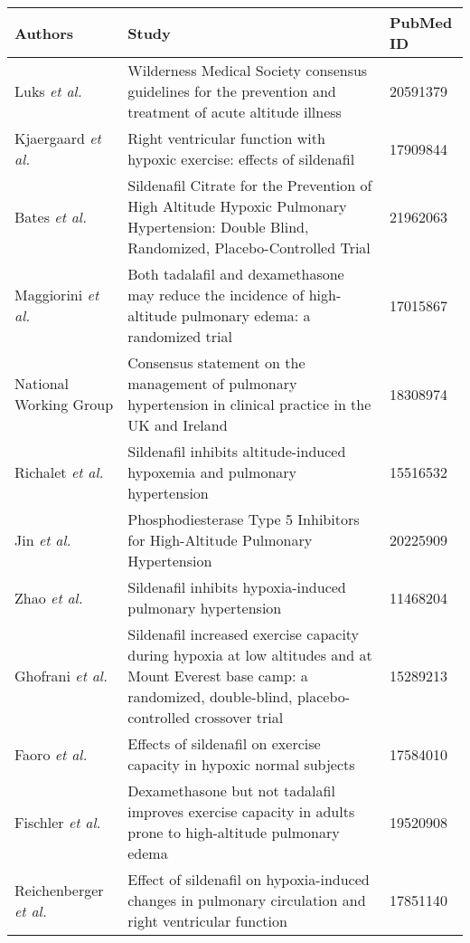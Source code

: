 \documentclass[12pt,a4paper]{article}
\begin{document}
\begin{longtabu} to\linewidth{X[l] X[2,l] X[l]}
    \toprule
    \rowfont\bfseries Authors & Study & PubMed ID \\
    \midrule
    \endhead
    Luks \emph{et al.}\cite{Luks:2010ht} & Wilderness Medical Society consensus guidelines for the prevention and treatment of acute altitude illness & 20591379 \\
    Kjaergaard \emph{et al.}\cite{Kjaergaard:2007hp} & Right ventricular function with hypoxic exercise: effects of sildenafil & 17909844 \\
    Bates \emph{et al.}\cite{Bates:2011du} & Sildenafil Citrate for the Prevention of High Altitude Hypoxic Pulmonary Hypertension: Double Blind, Randomized, Placebo-Controlled Trial & 21962063 \\
    Maggiorini \emph{et al.}\cite{Maggiorini:2006kz} & Both tadalafil and dexamethasone may reduce the incidence of high-altitude pulmonary edema: a randomized trial & 17015867 \\
    National Working Group\cite{NationalPulmonaryHypertensionCentresoftheUKandIreland:2008jh} & Consensus statement on the management of pulmonary hypertension in clinical practice in the UK and Ireland & 18308974 \\
    Richalet \emph{et al.}\cite{Richalet:2005el} & Sildenafil inhibits altitude-induced hypoxemia and pulmonary hypertension & 15516532 \\
    Jin \emph{et al.}\cite{Jin:2010fc} & Phosphodiesterase Type 5 Inhibitors for High-Altitude Pulmonary Hypertension & 20225909 \\
    Zhao \emph{et al.}\cite{Zhao:2001kj} & Sildenafil inhibits hypoxia-induced pulmonary hypertension & 11468204 \\
    Ghofrani \emph{et al.}\cite{Ghofrani:2004gp} & Sildenafil increased exercise capacity during hypoxia at low altitudes and at Mount Everest base camp: a randomized, double-blind, placebo-controlled crossover trial & 15289213 \\
    Faoro \emph{et al.}\cite{Faoro:2007ji} & Effects of sildenafil on exercise capacity in hypoxic normal subjects & 17584010 \\
    Fischler \emph{et al.}\cite{Fischler:2009ce} & Dexamethasone but not tadalafil improves exercise capacity in adults prone to high-altitude pulmonary edema & 19520908 \\
    Reichenberger \emph{et al.}\cite{Reichenberger:2007bw} & Effect of sildenafil on hypoxia-induced changes in pulmonary circulation and right ventricular function & 17851140 \\
    \bottomrule
\end{longtabu}
\end{document}
